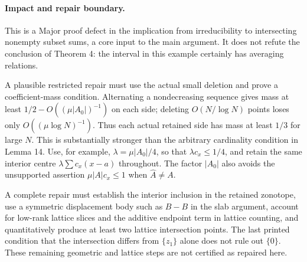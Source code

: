 \documentclass[10pt]{article}
\begin{document}
\paragraph*{Impact and repair boundary.}\mbox{}\par
This is a Major proof defect in the implication from irreducibility to intersecting nonempty subset sums, a core input to the main argument. It does not refute the conclusion of Theorem 4: the interval in this example certainly has averaging relations.\par
A plausible restricted repair must use the actual small deletion and prove a coefficient-mass condition. Alternating a nondecreasing sequence gives mass at least \(1/2-O((\mu|A_0|)^{-1})\) on each side; deleting \(O(N/\log N)\) points loses only \(O((\mu\log N)^{-1})\). Thus each actual retained side has mass at least \(1/3\) for large \(N\). This is substantially stronger than the arbitrary cardinality condition in Lemma 14. Use, for example, \(\lambda=\mu|A_0|/4\), so that \(\lambda c_x\le1/4\), and retain the same interior centre \(\lambda\sum c_x(x-a)\) throughout. The factor \(|A_0|\) also avoids the unsupported assertion \(\mu|A|c_x\le1\) when \(\widehat A\ne A\).\par
A complete repair must establish the interior inclusion in the retained zonotope, use a symmetric displacement body such as \(B-B\) in the slab argument, account for low-rank lattice slices and the additive endpoint term in lattice counting, and quantitatively produce at least two lattice intersection points. The last printed condition that the intersection differs from \(\{z_1\}\) alone does not rule out \(\{0\}\). These remaining geometric and lattice steps are not certified as repaired here.\par
\end{document}
